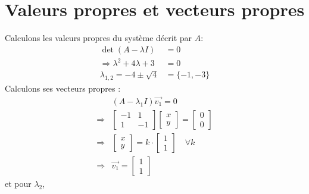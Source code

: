     
    \section{Valeurs propres et vecteurs propres}
        Calculons les valeurs propres du système décrit par $A$:
        \begin{equation}
            \begin{split}
            \det(A - \lambda I) &= 0 \\
            \Rightarrow \lambda^2 + 4\lambda + 3 &= 0\\
            \lambda_{1,2} = -4 \pm \sqrt{4} &= \{-1, -3\}
            \end{split}
        \end{equation}
        Calculons ses vecteurs propres :
        \begin{equation}
            \begin{split}
                &(A - \lambda_1 I)\overrightarrow{v_1} = 0 \\
                \Rightarrow& \begin{bmatrix} -1 & 1 \\ 1 & -1 \end{bmatrix} \begin{bmatrix} x \\ y \end{bmatrix} = \begin{bmatrix} 0 \\ 0 \end{bmatrix}\\
                \Rightarrow& \begin{bmatrix} x \\ y \end{bmatrix} = k \cdot \begin{bmatrix} 1 \\ 1 \end{bmatrix} \quad \forall k \\
                \Rightarrow& \overrightarrow{v_1} = \begin{bmatrix} 1 \\ 1 \end{bmatrix}
            \end{split}
        \end{equation}
        et pour $\lambda_2$,
